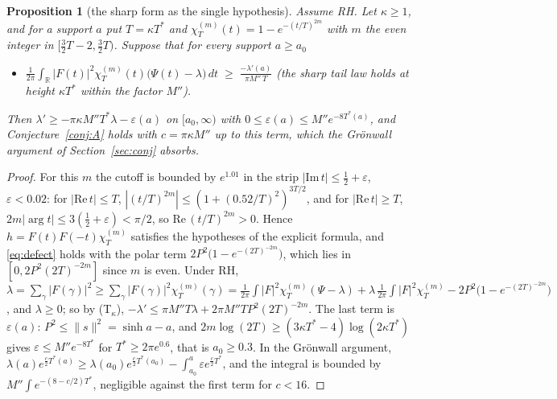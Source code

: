 \documentclass[11pt]{article}
\newtheorem{proposition}[theorem]{Proposition}
\theoremstyle{definition}
\theoremstyle{remark}
\newcommand{\R}{\mathbb{R}}
\newcommand{\Tst}{T^{*}}
\begin{document}
\begin{proposition}[the sharp form as the single hypothesis]\label{prop:sharp}
Assume RH. Let $\kappa\ge1$, and for a support $a$ put $T=\kappa\Tst$ and $\chi_T^{(m)}(t)=1-e^{-(t/T)^{2m}}$ with $m$ the even integer in $[\tfrac32T-2,\tfrac32T)$. Suppose that for every support $a\ge a_0$
\begin{itemize}
\item[(T$_\kappa$)] $\displaystyle\frac1{2\pi}\int_\R|F(t)|^2\chi^{(m)}_T(t)\big(\Psi(t)-\lambda\big)\,dt\;\ge\;\frac{-\lambda'(a)}{\pi M''\,T}$ \quad (the sharp tail law holds at height $\kappa\Tst$ within the factor $M''$).
\end{itemize}
Then $\lambda'\ge-\pi\kappa M''\Tst\lambda-\varepsilon(a)$ on $[a_0,\infty)$ with $0\le\varepsilon(a)\le M''e^{-8\Tst(a)}$, and Conjecture~\ref{conj:A} holds with $c=\pi\kappa M''$ up to this term, which the Gr\"onwall argument of Section~\ref{sec:conj} absorbs.
\end{proposition}
\begin{proof}
For this $m$ the cutoff is bounded by $e^{1.01}$ in the strip $|\mathrm{Im}\,t|\le\tfrac12+\varepsilon$, $\varepsilon<0.02$: for $|\mathrm{Re}\,t|\le T$, $|(t/T)^{2m}|\le(1+(0.52/T)^2)^{3T/2}$, and for $|\mathrm{Re}\,t|\ge T$, $2m|\arg t|\le3(\tfrac12+\varepsilon)<\pi/2$, so $\mathrm{Re}\,(t/T)^{2m}>0$. Hence $h=F(t)F(-t)\chi_T^{(m)}$ satisfies the hypotheses of the explicit formula, and \eqref{eq:defect} holds with the polar term $2P^2\big(1-e^{-(2T)^{-2m}}\big)$, which lies in $[0,2P^2(2T)^{-2m}]$ since $m$ is even. Under RH, $\lambda=\sum_\gamma|F(\gamma)|^2\ge\sum_\gamma|F(\gamma)|^2\chi_T^{(m)}(\gamma)=\frac1{2\pi}\int|F|^2\chi_T^{(m)}(\Psi-\lambda)+\lambda\,\frac1{2\pi}\int|F|^2\chi^{(m)}_T-2P^2\big(1-e^{-(2T)^{-2m}}\big)$, and $\lambda\ge0$; so by (T$_\kappa$), $-\lambda'\le\pi M''T\lambda+2\pi M''TP^2(2T)^{-2m}$. The last term is $\varepsilon(a)$: $P^2\le\|s\|^2=\sinh a-a$, and $2m\log(2T)\ge(3\kappa\Tst-4)\log(2\kappa\Tst)$ gives $\varepsilon\le M''e^{-8\Tst}$ for $\Tst\ge2\pi e^{0.6}$, that is $a_0\ge0.3$. In the Gr\"onwall argument, $\lambda(a)e^{\frac c2\Tst(a)}\ge\lambda(a_0)e^{\frac c2\Tst(a_0)}-\int_{a_0}^a\varepsilon e^{\frac c2\Tst}$, and the integral is bounded by $M''\int e^{-(8-c/2)\Tst}$, negligible against the first term for $c<16$.
\end{proof}
\end{document}
